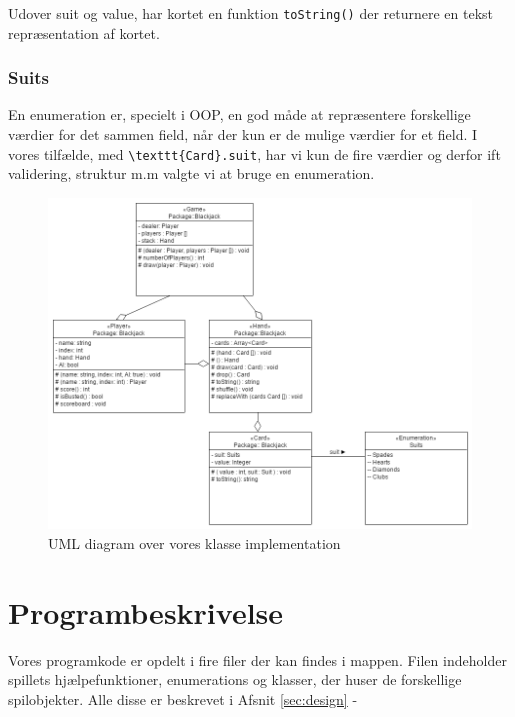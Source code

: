 \documentclass[a4paper]{article}
\begin{document}
      Udover suit og value, har kortet en funktion \lstinline$toString()$ der returnere en tekst repræsentation af kortet.
      

      \subsubsection*{Suits} \label{sssec:suits}
      En enumeration er, specielt i OOP, en god måde at repræsentere forskellige værdier for det sammen field, 
      når der kun er de mulige værdier for et field. I vores tilfælde, med \lstinline$\texttt{Card}.suit$,
      har vi kun de fire værdier og derfor ift validering, struktur m.m valgte vi at bruge en enumeration.

      \begin{figure}[H]
        \centering

        \includegraphics[width=520px]{figures/uml.png}

        \caption{UML diagram over vores klasse implementation}
        \label{fig:umlDiagram}
      \end{figure}

  \section{Programbeskrivelse} \label{sec:programDescription}
    Vores programkode er opdelt i fire filer der kan findes i  mappen.
    Filen  indeholder spillets hjælpefunktioner, enumerations og klasser,
    der huser de forskellige spilobjekter. Alle disse er beskrevet i Afsnit \ref{sec:design} - 
\end{document}
